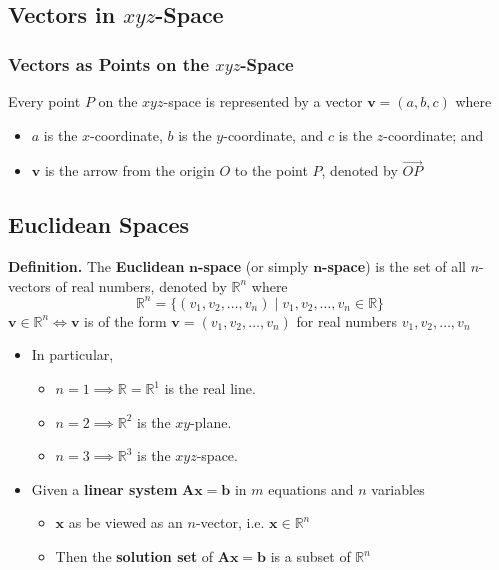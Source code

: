 \documentclass[../ma2001_notes.tex]{subfiles}
\begin{document}
\subsection{Vectors in $xyz$-Space}
\subsubsection{Vectors as Points on the $xyz$-Space}
Every point \(P\) on the \(xyz\)-space is represented by a vector \(\bm{v}=(a,b,c)\) where
\begin{itemize}
	\item\(a\) is the \(x\)-coordinate, \(b\) is the \(y\)-coordinate, and \(c\) is the \(z\)-coordinate; and
	\item\(\bm{v}\) is the arrow from the origin \(O\) to the point \(P\), denoted by \(\overrightarrow{OP}\)
\end{itemize}

\subsection{Euclidean Spaces}
\textbf{Definition.} The \textbf{Euclidean} \(\bm{n}\)\textbf{-space} (or simply \(\bm{n}\)\textbf{-space}) is the set of all \(n\)-vectors of real numbers, denoted by \(\mathbb{R}^n\) where
\[\mathbb{R}^n=\{(v_1,v_2,\ldots,v_n)\mid v_1,v_2,\ldots,v_n\in\mathbb{R}\}\]
\(\bm{v}\in\mathbb{R}^n\iff\bm{v}\) is of the form \(\bm{v}=(v_1,v_2,\ldots,v_n)\) for real numbers \(v_1,v_2,\ldots,v_n\) \\
\begin{itemize}
	\item In particular,
	\begin{itemize}
		\item\(n=1\implies\mathbb{R}=\mathbb{R}^1\) is the real line. 
		\item\(n=2\implies\mathbb{R}^2\) is the \(xy\)-plane. 
		\item\(n=3\implies\mathbb{R}^3\) is the \(xyz\)-space. 
	\end{itemize}
	\item Given a \textbf{linear system} \(\bm{Ax}=\bm{b}\) in \(m\) equations and \(n\) variables
	\begin{itemize}
		\item\(\bm{x}\) as be viewed as an \(n\)-vector, i.e. \(\bm{x}\in\mathbb{R}^n\)
		\item Then the \textbf{solution set} of \(\bm{Ax}=\bm{b}\) is a subset of \(\mathbb{R}^n\)
	\end{itemize}
\end{itemize}
\end{document}
